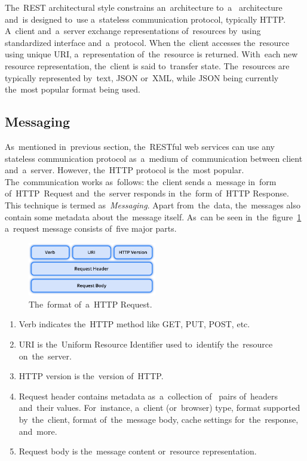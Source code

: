 The~REST architectural style constrains an~architecture to~a~
architecture and~is designed to~use a~stateless communication protocol,
typically HTTP. A~client and~a~server exchange representations of~resources
by~using standardized interface and~a~protocol. When the~client accesses
the~resource using unique URI, a~representation of~the~resource is returned.
With~each new resource representation, the~client is said to~transfer state.
The~resources are typically represented by~text, JSON or~XML, while JSON being
currently the~most popular format being used.



\subsection{Messaging}
As~mentioned in~previous section, the~RESTful web services can use any stateless
communication protocol as~a~medium of~communication between client and~a~server.
However, the~HTTP protocol is the~most popular. The~communication works
as~follows: the~client sends a~message in~form of~HTTP~Request and~the~server
responds in~the~form of~HTTP Response. This technique is termed
as~\textit{Messaging}. Apart from~the~data, the~messages also contain some
metadata about the~message itself. As~can be seen
in~the~figure~\ref{fig-HTTPRequest} a~request message consists of~five major
parts.

\begin{figure}[!hbt]
	\centering
	\includegraphics[width=0.5\textwidth]{./figures/http-request.pdf}
	\caption{The~format of~a~HTTP Request.}
	\label{fig-HTTPRequest}
\end{figure}

\begin{enumerate}
  \item Verb indicates the~HTTP method like GET, PUT, POST, etc.
  \item URI is the~Uniform Resource Identifier used to~identify the~resource
  on~the~server.
  \item HTTP version is the~version of~HTTP.
  \item Request header contains metadata as~a~collection of~ pairs
  of~headers and~their values. For~instance, a~client (or~browser) type, format
  supported by~the~client, format of~the~message body, cache settings
  for~the~response, and~more.
  \item Request body is the~message content or~resource representation.
\end{enumerate}

